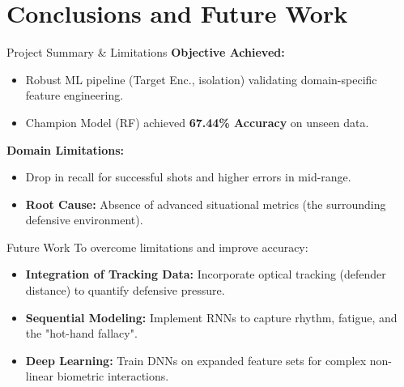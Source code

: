 \section{Conclusions and Future Work}

\begin{frame}{Project Summary \& Limitations}
    \textbf{Objective Achieved:}
    \begin{itemize}
        \item Robust ML pipeline (Target Enc., isolation) validating domain-specific feature engineering.
        \item Champion Model (RF) achieved \textbf{67.44\% Accuracy} on unseen data.
    \end{itemize}
    \vspace{0.3cm}
    \textbf{Domain Limitations:}
    \begin{itemize}
        \item Drop in recall for successful shots and higher errors in mid-range.
        \item \textbf{Root Cause:} Absence of advanced situational metrics (the surrounding defensive environment).
    \end{itemize}
\end{frame}

\begin{frame}{Future Work}
    To overcome limitations and improve accuracy:
    \begin{itemize}
        \item \textbf{Integration of Tracking Data:} Incorporate optical tracking (defender distance) to quantify defensive pressure.
        \item \textbf{Sequential Modeling:} Implement RNNs to capture rhythm, fatigue, and the "hot-hand fallacy".
        \item \textbf{Deep Learning:} Train DNNs on expanded feature sets for complex non-linear biometric interactions.
    \end{itemize}
\end{frame}